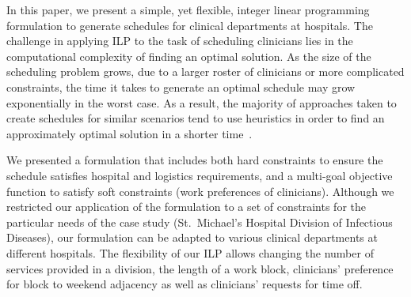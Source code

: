 In this paper, we present a simple, yet flexible, integer linear programming
formulation to generate schedules for clinical departments at hospitals.
The challenge in applying ILP to the task of scheduling clinicians lies in the
computational complexity of finding an optimal solution. As the size of the
scheduling problem grows, due to a larger roster of clinicians or more
complicated constraints, the time it takes to generate an optimal schedule may
grow exponentially in the worst case.
As a result, the majority of approaches taken to create schedules for similar
scenarios tend to use heuristics in order to find an approximately optimal
solution in a shorter time~\cite{burke_state_2004}. %


We presented a formulation that includes both hard constraints to ensure the
schedule satisfies hospital and logistics requirements, and a multi-goal
objective function to satisfy soft constraints (work preferences of clinicians).
Although we restricted our application of the formulation to a set of
constraints for the particular needs of the case study (St.\ Michael's Hospital
Division of Infectious Diseases), our formulation can be adapted to various
clinical departments at different hospitals. The flexibility of our ILP allows
changing the number of services provided in a division, the length of a work
block, clinicians' preference for block to weekend adjacency as well as
clinicians' requests for time off.

